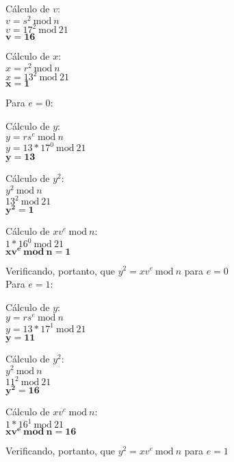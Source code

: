 \documentclass[12pt]{article}
\newcommand{\modd}{\ \text{mod}\ }
\begin{document}
\begin{itemize}
\begin{center}
					Cálculo de $v$:\\					
					$v = s^2 \modd n$\\
					$v = 17^2 \modd 21$\\
					$\mathbf{v = 16}$\\
				\end{center}
				\begin{center}
					Cálculo de $x$:\\					
					$x = r^2 \modd n$\\
					$x = 13^2 \modd 21$\\
					$\mathbf{x = 1}$\\
				\end{center}
				\newpage
				Para $e = 0$:
				\begin{center}
					Cálculo de $y$:\\					
					$y = rs^{e} \modd n$\\
					$y = 13*17^{0} \modd 21$\\					
					$\mathbf{y = 13}$\\
				\end{center}		
				\begin{center}
					Cálculo de $y^2$:\\					
					$y^2 \modd n$\\
					$13^2 \modd 21$\\
					$\mathbf{y^2 = 1}$\\
				\end{center}
				\begin{center}
					Cálculo de $xv^e \modd n$:\\					
					$1*16^0 \modd 21$\\
					$\mathbf{xv^e \modd n = 1}$\\
				\end{center}
				Verificando, portanto, que $y^2 = xv^e \modd n$ para $e = 0$\\
				Para $e = 1$:
				\begin{center}
					Cálculo de $y$:\\					
					$y = rs^{e} \modd n$\\
					$y = 13*17^{1} \modd 21$\\					
					$\mathbf{y = 11}$\\
				\end{center}		
				\begin{center}
					Cálculo de $y^2$:\\					
					$y^2 \modd n$\\
					$11^2 \modd 21$\\
					$\mathbf{y^2 = 16}$\\
				\end{center}
				\begin{center}
					Cálculo de $xv^e \modd n$:\\					
					$1*16^1 \modd 21$\\
					$\mathbf{xv^e \modd n = 16}$\\
				\end{center}
				Verificando, portanto, que $y^2 = xv^e \modd n$ para $e = 1$	
		\end{itemize}	
	\newpage				
\end{document}
